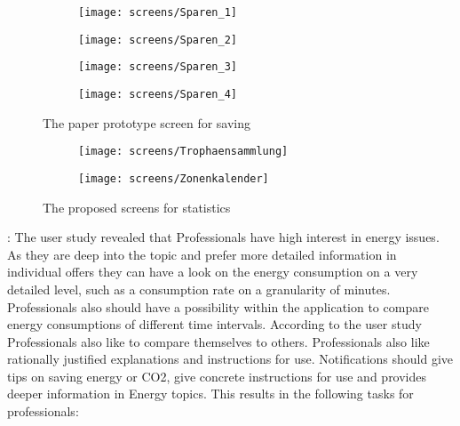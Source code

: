 \begin{figure}[h]
	\centering
	\begin{subfigure}[b]{0.24\columnwidth}
		\centering
		\texttt{[image: screens/Sparen\_1]}
		\label{fig:sparen:professional}
	\end{subfigure}
	\begin{subfigure}[b]{0.24\columnwidth}
		\centering
		\texttt{[image: screens/Sparen\_2]}
		\label{fig:sparen:optimizer}
	\end{subfigure}
	\begin{subfigure}[b]{0.24\columnwidth}
		\centering
		\texttt{[image: screens/Sparen\_3]}
		\label{fig:sparen:indifferent}
	\end{subfigure}
	\begin{subfigure}[b]{0.24\columnwidth}
		\centering
		\texttt{[image: screens/Sparen\_4]}
		\label{fig:sparen:hedonist}
	\end{subfigure}
	\caption{The paper prototype screen for saving}
	\label{fig:sparen} %
\end{figure}

\begin{figure}[h]
	\centering
	\begin{subfigure}[b]{0.24\columnwidth}
		\centering
		\texttt{[image: screens/Trophaensammlung]}
		\label{fig:trophaen}
	\end{subfigure}
	\begin{subfigure}[b]{0.24\columnwidth}
		\centering
		\texttt{[image: screens/Zonenkalender]}
		\label{fig:zonen:optimizer}
	\end{subfigure}
	\caption{The proposed screens for statistics}
	\label{fig:kalender-} %
\end{figure}




: The user study revealed that Professionals have high interest in energy issues. As they are deep into the topic and prefer more detailed information in individual offers they can have a look on the energy consumption on a very detailed level, such as a consumption rate on a granularity of minutes. Professionals also should have a possibility within the application to compare energy consumptions of different time intervals. According to the user study Professionals also like to compare themselves to others. Professionals also like rationally justified explanations and instructions for use. Notifications should give tips on saving energy or CO2, give concrete instructions for use and provides deeper information in Energy topics. This results in the following tasks for professionals:



